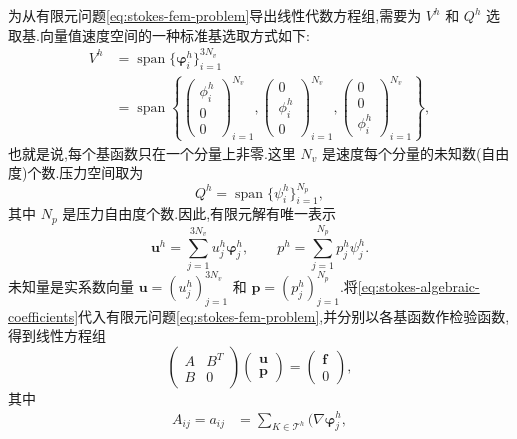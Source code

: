 \begin{note}[代数鞍点问题的推导]\label{note:stokes-algebraic-saddle-point}
为从有限元问题\cref{eq:stokes-fem-problem}导出线性代数方程组,需要为 $V^h$ 和 $Q^h$ 选取基.向量值速度空间的一种标准基选取方式如下:
\[
\begin{aligned}
  V^h&=\operatorname{span}\{\symbf{\varphi}_i^h\}_{i=1}^{3N_v}\\
  &=\operatorname{span}\left\{
    \begin{pmatrix}\phi_i^h\\0\\0\end{pmatrix}_{i=1}^{N_v},
    \begin{pmatrix}0\\\phi_i^h\\0\end{pmatrix}_{i=1}^{N_v},
    \begin{pmatrix}0\\0\\\phi_i^h\end{pmatrix}_{i=1}^{N_v}
  \right\},
\end{aligned}
\]
也就是说,每个基函数只在一个分量上非零.这里 $N_v$ 是速度每个分量的未知数(自由度)个数.压力空间取为
\[
  Q^h=\operatorname{span}\{\psi_i^h\}_{i=1}^{N_p},
\]
其中 $N_p$ 是压力自由度个数.因此,有限元解有唯一表示
\begin{equation}\label{eq:stokes-algebraic-coefficients}
  \bm{u}^h=\sum_{j=1}^{3N_v}u_j^h\symbf{\varphi}_j^h,
  \qquad
  p^h=\sum_{j=1}^{N_p}p_j^h\psi_j^h.
\end{equation}
未知量是实系数向量 $\bm{u}=(u_j^h)_{j=1}^{3N_v}$ 和
$\bm{p}=(p_j^h)_{j=1}^{N_p}$.将\cref{eq:stokes-algebraic-coefficients}代入有限元问题\cref{eq:stokes-fem-problem},并分别以各基函数作检验函数,得到线性方程组
\begin{equation}\label{eq:stokes-algebraic-saddle-point-system}
  \begin{pmatrix}A&B^T\\B&0\end{pmatrix}
  \begin{pmatrix}\bm{u}\\\bm{p}\end{pmatrix}
  =\begin{pmatrix}\bm{f}\\0\end{pmatrix},
\end{equation}
其中
\begin{align}
  A_{ij}=a_{ij}
   &=\sum_{K\in\mathcal{T}^h}
       (\nabla\symbf{\varphi}_j^h,

\end{align}
\end{note}

